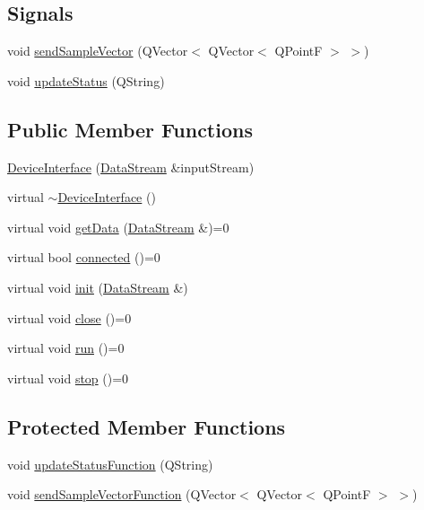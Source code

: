 \subsection*{Signals}
\begin{DoxyCompactItemize}
\item 
void \hyperlink{classDeviceInterface_ae1bcd766865161a659076d2561e79dc5}{send\+Sample\+Vector} (Q\+Vector$<$ Q\+Vector$<$ Q\+PointF $>$ $>$)
\item 
void \hyperlink{classDeviceInterface_ac64a65f54f41f0b7ff4c846ac7fdbef7}{update\+Status} (Q\+String)
\end{DoxyCompactItemize}
\subsection*{Public Member Functions}
\begin{DoxyCompactItemize}
\item 
\hyperlink{classDeviceInterface_a9923935a7fa7b3134568ec7fd97705e3}{Device\+Interface} (\hyperlink{classDataStream}{Data\+Stream} \&input\+Stream)
\item 
virtual \hyperlink{classDeviceInterface_a668a221c7a77701e25719f406d407746}{$\sim$\+Device\+Interface} ()
\item 
virtual void \hyperlink{classDeviceInterface_aeaf032ef412df905fe4f2609cc284887}{get\+Data} (\hyperlink{classDataStream}{Data\+Stream} \&)=0
\item 
virtual bool \hyperlink{classDeviceInterface_a4c7fa83218b6a7c5700cb75253b2165e}{connected} ()=0
\item 
virtual void \hyperlink{classDeviceInterface_a03e9c1bfeabe1a97f05bf9107b89ae67}{init} (\hyperlink{classDataStream}{Data\+Stream} \&)
\item 
virtual void \hyperlink{classDeviceInterface_a08473443413b1725a3930aace12e2837}{close} ()=0
\item 
virtual void \hyperlink{classDeviceInterface_a6511c2845f5198acc94f5d7dd21cae57}{run} ()=0
\item 
virtual void \hyperlink{classDeviceInterface_a101b3b53a01add866737920e03a850a8}{stop} ()=0
\end{DoxyCompactItemize}
\subsection*{Protected Member Functions}
\begin{DoxyCompactItemize}
\item 
void \hyperlink{classDeviceInterface_a83df9dc924dbe0e6c3e0d0fef2a604d0}{update\+Status\+Function} (Q\+String)
\item 
void \hyperlink{classDeviceInterface_adae4c7e07e9bdbbe62be961fd306b5c8}{send\+Sample\+Vector\+Function} (Q\+Vector$<$ Q\+Vector$<$ Q\+PointF $>$ $>$)
\end{DoxyCompactItemize}
